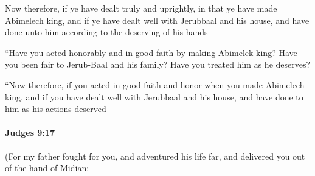 			\begin{versebox}
					\item[BHS] 
					\item[ASV] Now therefore, if ye have dealt truly and uprightly, in that ye have made Abimelech king, and if ye have dealt well with Jerubbaal and his house, and have done unto him according to the deserving of his hands
					\item[NIV] “Have you acted honorably and in good faith by making Abimelek king? Have you been fair to Jerub-Baal and his family? Have you treated him as he deserves?
					\item[NRSV] “Now therefore, if you acted in good faith and honor when you made Abimelech king, and if you have dealt well with Jerubbaal and his house, and have done to him as his actions deserved—
			\end{versebox}

		\paragraph{Judges 9:17} %
			\label{JUDGES-9-17}

			(For my father fought for you, and adventured his life far, and delivered you out of the hand of Midian:

